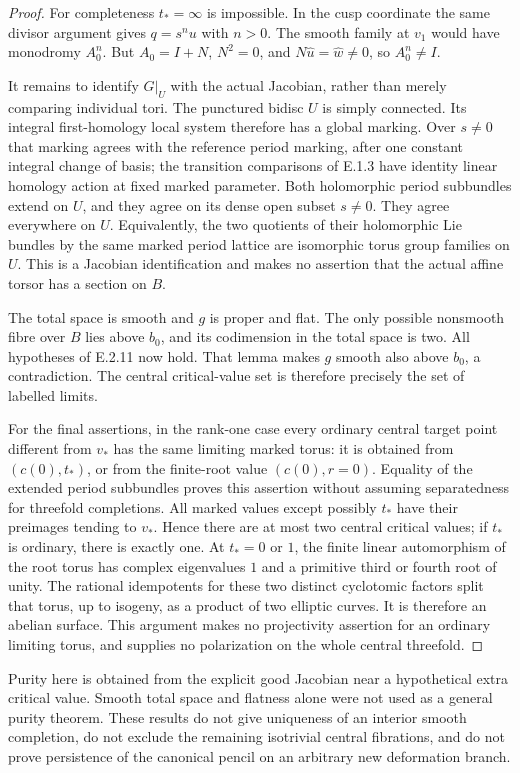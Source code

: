 \begin{proof}
For completeness $t_*=\infty$ is impossible.  In the
cusp coordinate the same divisor argument gives
$q=s^n u$ with $n>0$.  The smooth family at $v_1$
would have monodromy $A_0^n$.  But
$A_0=I+N$, $N^2=0$, and
$N\widehat u=\widehat w\ne0$, so $A_0^n\ne I$.

It remains to identify $G|_U$ with the actual Jacobian,
rather than merely comparing individual tori.
The punctured bidisc $U$ is simply connected.  Its
integral first-homology local system therefore has
a global marking.  Over $s\ne0$ that marking agrees
with the reference period marking, after one constant
integral change of basis; the transition comparisons
of E.1.3 have identity linear homology action at
fixed marked parameter.  Both holomorphic period
subbundles extend on $U$, and they agree on its dense
open subset $s\ne0$.  They agree everywhere on $U$.
Equivalently, the two quotients of their holomorphic
Lie bundles by the same marked period lattice are
isomorphic torus group families on $U$.  This is a
Jacobian identification and makes no assertion that
the actual affine torsor has a section on $B$.

The total space is smooth and $g$ is proper and flat.
The only possible nonsmooth fibre over $B$ lies above
$b_0$, and its codimension in the total space is two.
All hypotheses of E.2.11 now hold.  That lemma makes
$g$ smooth also above $b_0$, a contradiction.  The
central critical-value set is therefore precisely
the set of labelled limits.

For the final assertions, in the rank-one case every
ordinary central target point different from $v_*$
has the same limiting marked torus: it is obtained
from $(c(0),t_*)$, or from the finite-root value
$(c(0),r=0)$.  Equality of the extended period
subbundles proves this assertion without assuming
separatedness for threefold completions.
All marked values except possibly $t_*$ have their
preimages tending to $v_*$.  Hence there are at most
two central critical values; if $t_*$ is ordinary,
there is exactly one.
At $t_*=0$ or $1$, the finite linear automorphism of
the root torus has complex eigenvalues $1$ and a
primitive third or fourth root of unity.  The
rational idempotents for these two distinct
cyclotomic factors split that torus, up to isogeny,
as a product of two elliptic curves.  It is therefore
an abelian surface.  This argument makes no
projectivity assertion for an ordinary limiting
torus, and supplies no polarization on the whole
central threefold.
\end{proof}

\begin{remark}[Scope of E.2.11--E.2.12]
Purity here is obtained from the explicit good
Jacobian near a hypothetical extra critical value.
Smooth total space and flatness alone were not used
as a general purity theorem.  These results do not
give uniqueness of an interior smooth completion,
do not exclude the remaining isotrivial central
fibrations, and do not prove persistence of the
canonical pencil on an arbitrary new deformation
branch.
\end{remark}
